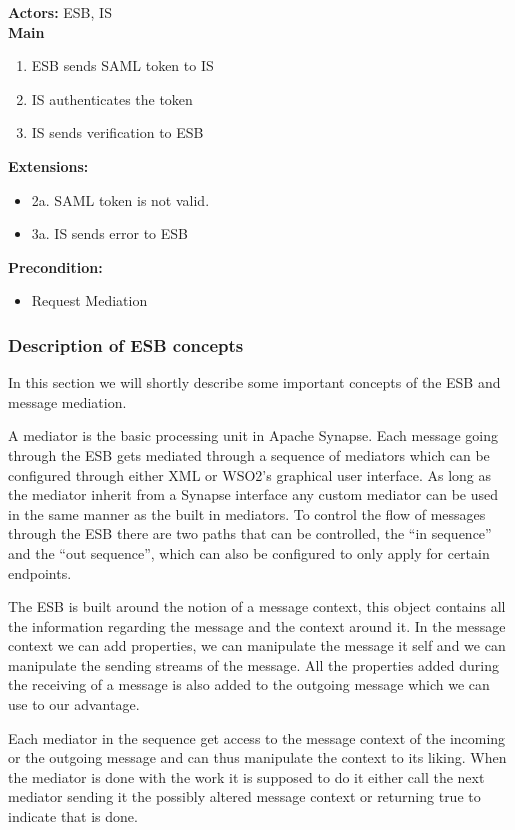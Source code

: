     \textbf{Actors:} ESB, IS\\
    \textbf{Main}
    \begin{enumerate}
        \item ESB sends SAML token to IS
        \item IS authenticates the token
        \item IS sends verification to ESB
    \end{enumerate}
    \textbf{Extensions:}
    \begin{itemize}
        \item[]	2a. SAML token is not valid.
        \item[]	3a. IS sends error to ESB
    \end{itemize}
    \textbf{Precondition:}
    \begin{itemize}
        \item Request Mediation
    \end{itemize}

    \subsubsection{Description of ESB concepts}\label{Description of ESB concepts} 

    In this section we will shortly describe some important concepts of the ESB and message mediation.

    A mediator is the basic processing unit in Apache Synapse. Each message going through the ESB gets mediated through a sequence of mediators which can be configured through either XML or WSO2’s graphical user interface. As long as the mediator inherit from a Synapse interface any custom mediator can be used in the same manner as the built in mediators. To control the flow of messages through the ESB there are two paths that can be controlled, the “in sequence” and the “out sequence”, which can also be configured to only apply for certain endpoints.

    The ESB is built around the notion of a message context, this object contains all the information regarding the message and the context around it. In the message context we can add properties, we can manipulate the message it self and we can manipulate the sending streams of the message. All the properties added during the receiving of a message is also added to the outgoing message which we can use to our advantage.

    Each mediator in the sequence get access to the message context of the incoming or the outgoing message and can thus manipulate the context to its liking. When the mediator is done with the work it is supposed to do it either call the next mediator sending it the possibly altered message context or returning true to indicate that is done.

